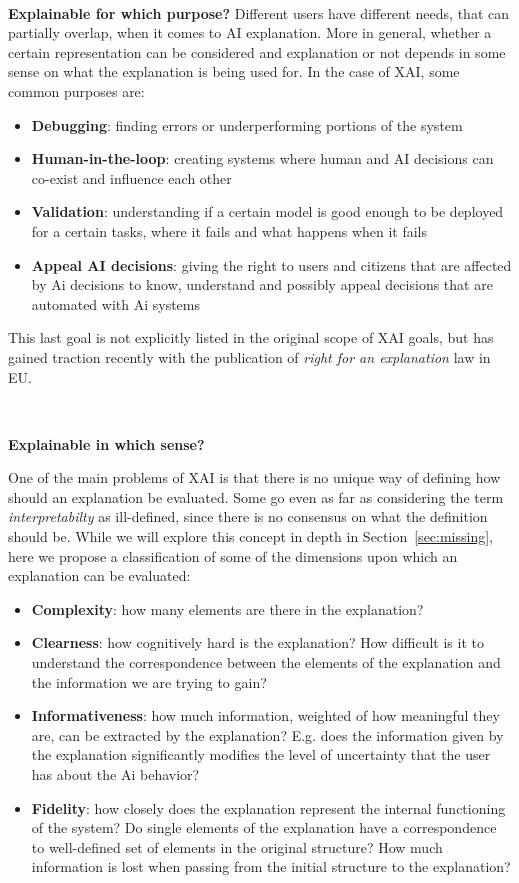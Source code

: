 \documentclass[conference]{IEEEtran}
\newcommand{\cit}{\todo[tickmarkheight=0.2cm]{cit}}
\begin{document}
\

\textbf{Explainable for which purpose?} Different users have different needs, that can partially overlap, when it comes to AI explanation. More in general, whether a certain representation can be considered and explanation or not depends in some sense on what the explanation is being used for. In the case of XAI, some common purposes are:

\begin{itemize}
    \item \textbf{Debugging}: finding errors or underperforming portions of the system
    \item \textbf{Human-in-the-loop}: creating systems where human and AI decisions can co-exist and influence each other
    \item \textbf{Validation}: understanding if a certain model is good enough to be deployed for a certain tasks, where it fails and what happens when it fails
    \item \textbf{Appeal AI decisions}: giving the right to users and citizens that are affected by Ai decisions to know, understand and possibly appeal decisions that are automated with Ai systems
\end{itemize}

This last goal is not explicitly listed in the original scope of XAI goals, but has gained traction recently with the publication of \textit{right for an explanation} law in EU. \cit

\

\textbf{Explainable in which sense?}

One of the main problems of XAI is that there is no unique way of defining how should an explanation be evaluated. Some \cit go even as far as considering the term \textit{interpretabilty} as ill-defined, since there is no consensus on what the definition should be. While we will explore this concept in depth in Section~\ref{sec:missing}, here we propose a classification of some of the dimensions upon which an explanation can be evaluated:

\begin{itemize}
    \item \textbf{Complexity}: how many elements are there in the explanation?
    \item \textbf{Clearness}: how cognitively hard is the explanation? How difficult is it to understand the correspondence between the elements of the explanation and the information we are trying to gain?
    \item \textbf{Informativeness}: how much information, weighted of how meaningful they are, can be extracted by the explanation? E.g. does the information given by the explanation significantly modifies the level of uncertainty that the user has about the Ai behavior?
    \item \textbf{Fidelity}: how closely does the explanation represent the internal functioning of the system? Do single elements of the explanation have a correspondence to well-defined set of elements in the original structure? How much information is lost when passing from the initial structure to the explanation?
\end{itemize}
\end{document}
